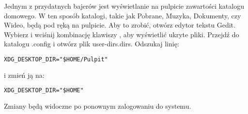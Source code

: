 Jednym z przydatnych bajerów jest wyświetlanie na pulpicie zawartości katalogu domowego. W ten sposób katalogi, takie jak Pobrane, Muzyka, Dokumenty, czy Wideo, będą pod ręką na pulpicie. Aby to zrobić, otwórz edytor tekstu Gedit. Wybierz  i wciśnij kombinację klawiszy , aby wyświetlić ukryte pliki. Przejdź do katalogu .config i otwórz plik \textcolor{ubuntu_orange}{user-dirs.dirs}. Odszukaj linię:
\begin{lstlisting}
XDG_DESKTOP_DIR="$HOME/Pulpit"
\end{lstlisting}
i zmień ją na:
\begin{lstlisting}
XDG_DESKTOP_DIR="$HOME"
\end{lstlisting}

Zmiany będą widoczne po ponownym zalogowaniu do systemu.
